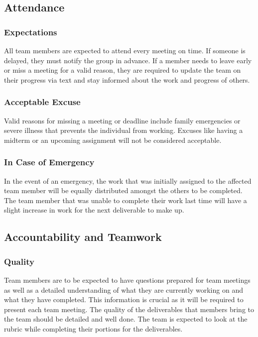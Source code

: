 \documentclass{article}
\begin{document}

\subsection*{Attendance}

\subsubsection*{Expectations}
All team members are expected to attend every meeting on time. If someone is delayed, they must notify the group in advance. If a member needs to leave early or miss a meeting for a valid reason, they are required to update the team on their progress via text and stay informed about the work and progress of others.

\subsubsection*{Acceptable Excuse}
Valid reasons for missing a meeting or deadline include family emergencies or severe illness that prevents the individual from working. Excuses like having a midterm or an upcoming assignment will not be considered acceptable.

\subsubsection*{In Case of Emergency}
In the event of an emergency, the work that was initially assigned to the affected team member will be equally distributed amongst the others to be completed. The team member that was unable to complete their work last time will have a slight increase in work for the next deliverable to make up.


\subsection*{Accountability and Teamwork}

\subsubsection*{Quality} 
Team members are to be expected to have questions prepared for team meetings as well as a detailed understanding of what they are currently working on and what they have completed. This information is crucial as it will be required to present each team meeting. The quality of the deliverables that members bring to the team should be detailed and well done. The team is expected to look at the rubric while completing their portions for the deliverables.
\end{document}
